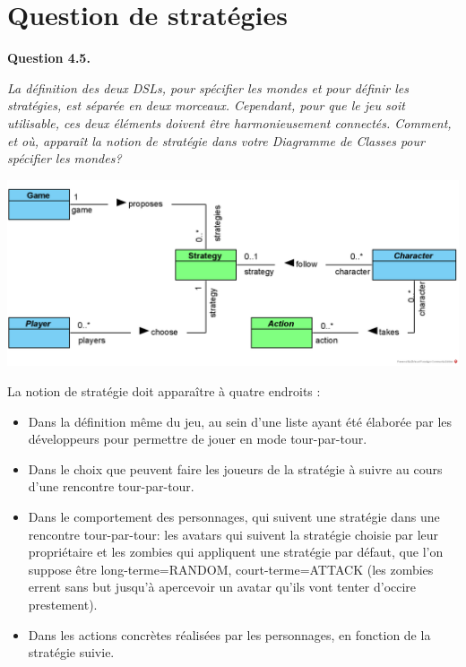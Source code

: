 \documentclass[oneside,a4paper]{book}
\begin{document}
\begin{minipage}{\textwidth}
\section{Question de stratégies}

\textbf{Question 4.5.}\label{Question 4.5.}\newline

\textit{La définition des deux DSLs, pour spécifier les mondes et pour définir les stratégies, est séparée en deux morceaux. Cependant, pour que le jeu soit utilisable, ces deux éléments doivent être harmonieusement connectés. Comment, et où, apparaît la notion de stratégie dans votre Diagramme de Classes pour spécifier les mondes?}\newline

\includegraphics[width=\textwidth,height=\textheight,keepaspectratio]{Diagrams/DJ-Strategy.png}
\end{minipage}
\begin{samepage}
La notion de stratégie doit apparaître à quatre endroits :
\begin{itemize}
    \item Dans la définition même du jeu, au sein d'une liste ayant été élaborée par les développeurs pour permettre de jouer en mode tour-par-tour.
    \item Dans le choix que peuvent faire les joueurs de la stratégie à suivre au cours d'une rencontre tour-par-tour.
    \item Dans le comportement des personnages, qui suivent une stratégie dans une rencontre tour-par-tour: les avatars qui suivent la stratégie choisie par leur propriétaire et les zombies qui appliquent une stratégie par défaut, que l'on suppose être long-terme=RANDOM, court-terme=ATTACK (les zombies errent sans but jusqu'à apercevoir un avatar qu'ils vont tenter d'occire prestement).
    \item Dans les actions concrètes réalisées par les personnages, en fonction de la stratégie suivie.
\end{itemize}
\end{samepage}
\end{document}
